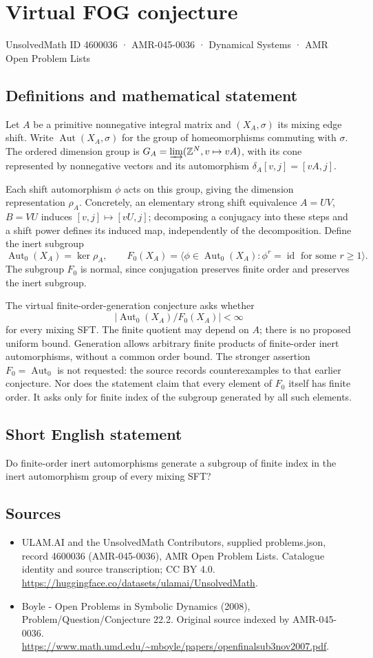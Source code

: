 \documentclass[11pt,a4paper]{article}
\begin{document}
\section*{Virtual FOG conjecture}\label{4600036}
{\small UnsolvedMath ID 4600036 · AMR-045-0036 · Dynamical Systems · AMR Open Problem Lists}
\subsection{Definitions and mathematical statement}
Let $A$ be a primitive nonnegative integral matrix and $(X_A,\sigma)$
its mixing edge shift. Write $\operatorname{Aut}(X_A,\sigma)$ for the
group of homeomorphisms commuting with $\sigma$. The ordered dimension
group is $G_A=\varinjlim(\mathbb Z^N,v\mapsto vA)$, with its cone
represented by nonnegative vectors and its automorphism
$\delta_A[v,j]=[vA,j]$.

Each shift automorphism $\phi$ acts on this group, giving the dimension
representation $\rho_A$. Concretely, an elementary strong shift
equivalence $A=UV$, $B=VU$ induces $[v,j]\mapsto[vU,j]$; decomposing
a conjugacy into these steps and a shift power defines its induced map,
independently of the decomposition. Define the inert subgroup
\[
 \operatorname{Aut}_0(X_A)=\ker\rho_A,
 \qquad
 F_0(X_A)=\langle\phi\in\operatorname{Aut}_0(X_A):
                      \phi^r=\operatorname{id}\text{ for some }r\ge1\rangle.
\]
The subgroup $F_0$ is normal, since conjugation preserves finite order
and preserves the inert subgroup.

The virtual finite-order-generation conjecture asks whether
\[
 |\operatorname{Aut}_0(X_A)/F_0(X_A)|<\infty
\]
for every mixing SFT. The finite quotient may depend on $A$; there is
no proposed uniform bound. Generation allows arbitrary finite products
of finite-order inert automorphisms, without a common order bound.
The stronger assertion $F_0=\operatorname{Aut}_0$ is not requested:
the source records counterexamples to that earlier conjecture. Nor
does the statement claim that every element of $F_0$ itself has finite
order. It asks only for finite index of the subgroup generated by
all such elements.
\subsection{Short English statement}
Do finite-order inert automorphisms generate a subgroup of finite index in the inert automorphism group of every mixing SFT?
\subsection{Sources}
\begin{itemize}
\item[S1] ULAM.AI and the UnsolvedMath Contributors, supplied problems.json, record 4600036 (AMR-045-0036), AMR Open Problem Lists. Catalogue identity and source transcription; CC BY 4.0.
\url{https://huggingface.co/datasets/ulamai/UnsolvedMath}.
\item[S2] Boyle - Open Problems in Symbolic Dynamics (2008), Problem/Question/Conjecture 22.2. Original source indexed by AMR-045-0036.
\url{https://www.math.umd.edu/~mboyle/papers/openfinalsub3nov2007.pdf}.
\end{itemize}
\end{document}
